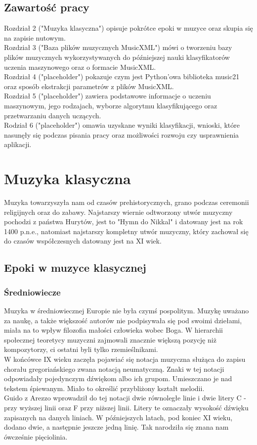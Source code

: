 \documentclass[printmode, eng, openany]{mgr}
\newcommand\tab[1][1cm]{\hspace*{#1}}
\begin{document}
\section{Zawartość pracy}
\tab Rozdział 2 ("Muzyka klasyczna") opisuje pokrótce epoki w muzyce oraz skupia się na zapisie nutowym.\\
\tab Rozdział 3 ("Baza plików muzycznych MusicXML") mówi o tworzeniu bazy plików muzycznych wykorzystywanych do późniejszej nauki klasyfikatorów uczenia maszynowego oraz o formacie MusicXML.\\ 
\tab Rozdział 4 ("placeholder") pokazuje czym jest Python'owa biblioteka music21 oraz sposób ekstrakcji parametrów z plików MusicXML.\\ 
\tab Rozdział 5 ("placeholder") zawiera podstawowe informacje o uczeniu maszynowym, jego rodzajach, wyborze algorytmu klasyfikującego oraz przetwarzaniu danych uczących.\\ 
\tab Rodział 6 ("placeholder") omawia uzyskane wyniki klasyfikacji, wnioski, które nasunęły się podczas pisania pracy oraz możliwości rozwoju czy usprawnienia aplikacji. \\ 
\chapter{Muzyka klasyczna}
\tab Muzyka towarzyszyła nam od czasów prehistorycznych, grano podczas ceremonii religijnych oraz do zabawy. Najstarszy wiernie odtworzony utwór muzyczny pochodzi z państwa Hurytów, jest to "Hymn do Nikkal" i datowany jest na rok 1400 p.n.e., natomiast najstarszy kompletny utwór muzyczny, który zachował się do czasów współczesnych datowany jest na XI wiek.
\section{Epoki w muzyce klasycznej}
\subsection{Średniowiecze}
\tab Muzyka w średniowiecznej Europie nie była czymś pospolitym. Muzykę uważano za naukę, a także większość autorów nie podpisywała się pod swoimi dziełami, miała na to wpływ filozofia małości człowieka wobec Boga. W hierarchii społecznej teoretycy muzyczni zajmowali znacznie większą pozycję niż kompozytorzy, ci ostatni byli tylko rzemieślnikami. \\
\tab W końcówce IX wieku zaczęła pojawiać się notacja muzyczna służąca do zapisu chorału gregoriańskiego zwana notacją neumatyczną. Znaki w tej notacji odpowiadały pojedynczym dźwiękom albo ich grupom. Umieszczano je nad tekstem śpiewanym. Miało to określić przybliżony kształt melodii. \\
\tab Guido z Arezzo wprowadził do tej notacji dwie równoległe linie i dwie litery C - przy wyższej linii oraz F przy niższej linii. Litery te oznaczały wysokość dźwięku zapisanych na danych liniach. W późniejszych latach, pod koniec XI wieku, dodano dwie, a następnie jeszcze jedną linię. Tak narodziła się znana nam ówcześnie pięciolinia.
\end{document}
